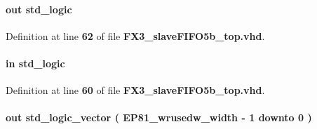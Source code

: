 \paragraph[{E\+P81\+\_\+wfull}]{ {\bfseries \textcolor{keywordflow}{out}\textcolor{vhdlchar}{ }} {\bfseries \textcolor{comment}{std\+\_\+logic}\textcolor{vhdlchar}{ }} \hspace{0.3cm}{\ttfamily [Port]}}\label{classFX3__slaveFIFO5b__top_afc2f115e9e8474f8b9188c5ed5bbde1d}


Definition at line {\bf 62} of file {\bf F\+X3\+\_\+slave\+F\+I\+F\+O5b\+\_\+top.\+vhd}.

\paragraph[{E\+P81\+\_\+wr}]{ {\bfseries \textcolor{keywordflow}{in}\textcolor{vhdlchar}{ }} {\bfseries \textcolor{comment}{std\+\_\+logic}\textcolor{vhdlchar}{ }} \hspace{0.3cm}{\ttfamily [Port]}}\label{classFX3__slaveFIFO5b__top_a99727b06937e1a03e0733717f4c42f70}


Definition at line {\bf 60} of file {\bf F\+X3\+\_\+slave\+F\+I\+F\+O5b\+\_\+top.\+vhd}.

\paragraph[{E\+P81\+\_\+wrusedw}]{ {\bfseries \textcolor{keywordflow}{out}\textcolor{vhdlchar}{ }} {\bfseries \textcolor{comment}{std\+\_\+logic\+\_\+vector}\textcolor{vhdlchar}{ }\textcolor{vhdlchar}{(}\textcolor{vhdlchar}{ }\textcolor{vhdlchar}{ }\textcolor{vhdlchar}{ }\textcolor{vhdlchar}{ }{\bfseries {\bf E\+P81\+\_\+wrusedw\+\_\+width}} \textcolor{vhdlchar}{-\/}\textcolor{vhdlchar}{ } \textcolor{vhdldigit}{1} \textcolor{vhdlchar}{ }\textcolor{keywordflow}{downto}\textcolor{vhdlchar}{ }\textcolor{vhdlchar}{ } \textcolor{vhdldigit}{0} \textcolor{vhdlchar}{ }\textcolor{vhdlchar}{)}\textcolor{vhdlchar}{ }} \hspace{0.3cm}{\ttfamily [Port]}}\label{classFX3__slaveFIFO5b__top_a1d2b9d31a24dd28749a4fda0c0ecced7}


